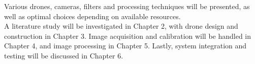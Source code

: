 Various drones, cameras, filters and processing techniques will be presented, as well as optimal choices depending on available resources.\\

A literature study will be investigated in Chapter 2, with drone design and construction in Chapter 3. Image acquisition and calibration will be handled in Chapter 4, and image processing in Chapter 5. Lastly, system integration and testing will be discussed in Chapter 6.